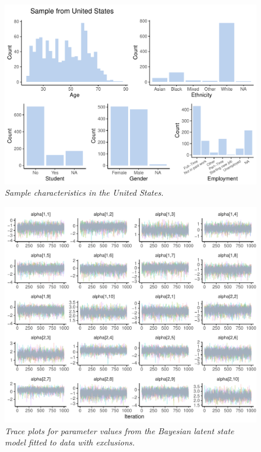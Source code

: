 \documentclass[
  man,floatsintext]{apa6}
\begin{document}
\newpage



\begin{figure}
\centering
\includegraphics{manuscript_files/figure-latex/plotSampleUS-1.pdf}
\caption{\label{fig:plotSampleUS}\emph{Sample characteristics in the United States.}}
\end{figure}

\newpage




\begin{figure}
\centering
\includegraphics{manuscript_files/figure-latex/plotTrace-1.pdf}
\caption{\label{fig:plotTrace}\emph{Trace plots for parameter values from the Bayesian
latent state model fitted to data with exclusions.}}
\end{figure}
\end{document}
